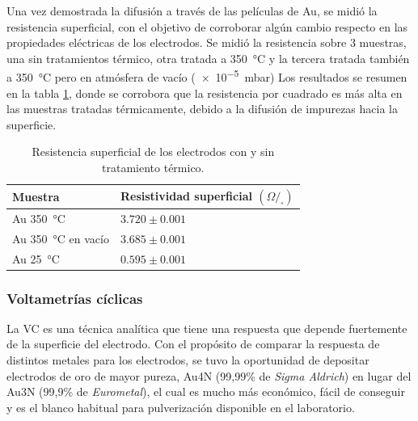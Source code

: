 {			Una vez demostrada la difusión a través de las películas de Au, se midió la resistencia superficial, con el objetivo de corroborar algún cambio respecto en las propiedades eléctricas de los electrodos. Se midió la resistencia sobre 3 muestras, una sin tratamientos térmico, otra tratada a \SI{350}{\celsius} y la tercera tratada también a \SI{350}{\celsius} pero en atmósfera de vacío (\SI{e-5}{\milli\bar}) Los resultados se resumen en la tabla \ref{tabla:resistencia}, donde se corrobora que la resistencia por cuadrado es más alta en las muestras tratadas térmicamente, debido a la difusión de impurezas hacia la superficie. 

				\begin{table}[ht!]
			  		  \caption[Resistencia superficial de los electrodos]{Resistencia superficial de los electrodos con y sin tratamiento térmico.} 
			  		  \begin{tabular}{>{\raggedright\arraybackslash}m{4.2cm}>{\raggedright\arraybackslash}m{7.075cm}} 
			  		  \toprule
					  Muestra & Resistividad superficial $(\Omega/_{\square})$  \\ \midrule
			      	  Au\index{oro} \SI{350}{\celsius} 		  	& $3.720 \pm 0.001$		 \\	  
			      	  Au\index{oro} \SI{350}{\celsius} en vacío	& $3.685 \pm 0.001$		 \\	  
			      	  Au\index{oro} \SI{25}{\celsius}    	  		& $0.595 \pm 0.001$		 \\ 
			      	  \bottomrule
			    	  \end{tabular}
			    	  \label{tabla:resistencia}
			   		  \end{table}
		
		\subsubsection{Voltametrías cíclicas}

			La VC es una técnica analítica que tiene una respuesta que depende fuertemente de la superficie del electrodo.\cite{Wi2000,Pumera2007,Gewirth2004,Villullas2000} Con el propósito de comparar la respuesta de distintos metales para los electrodos, se tuvo la oportunidad de depositar electrodos de oro de mayor pureza, Au4N (99,99\% de \textit{Sigma Aldrich}) en lugar del Au3N (99,9\% de \textit{Eurometal}), el cual es mucho más económico, fácil de conseguir y es el blanco habitual para pulverización disponible en el laboratorio.  

}
